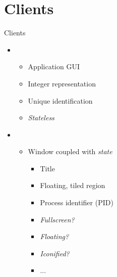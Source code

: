 
\section{Clients}

\begin{frame}[t]{Clients}

    \begin{itemize}
        \itemsep.3em

        \item {}
            \begin{itemize}
                \item Application GUI
                \item Integer representation
                \item Unique identification
                \item \textit{Stateless}
            \end{itemize}

        \item {}
            \begin{itemize}
                \item Window coupled with \textit{state}
                    \begin{itemize}
                        \item Title
                        \item Floating, tiled region
                        \item Process identifier (PID)
                        \item \textit{Fullscreen?}
                        \item \textit{Floating?}
                        \item \textit{Iconified?}
                        \item ...
                    \end{itemize}
            \end{itemize}

    \end{itemize}

    \vfill

\end{frame}

